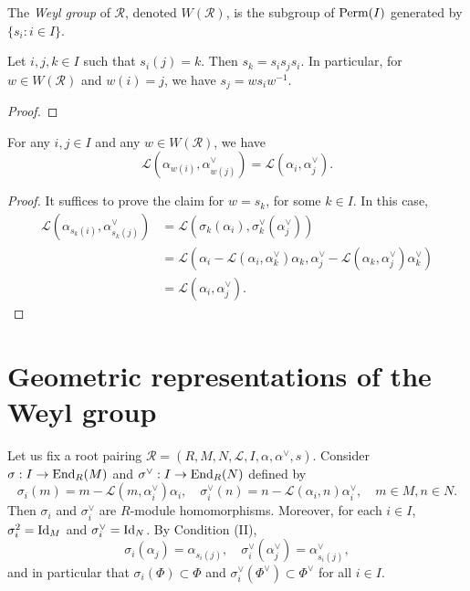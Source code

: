 \begin{definition}
    The {\it Weyl group} of $\mathcal{R}$, denoted $W(\mathcal{R})$, is the subgroup of ${\rm Perm}(I)$ 
    generated by $\{s_i : i \in I\}$. 
\end{definition}
\begin{lemma}
    Let $i,j,k \in I$ such that $s_i(j) = k$. Then $s_k = s_is_js_i$. In particular, for 
    $w \in W(\mathcal{R})$ and $w(i) = j$, we have $s_j = ws_iw^{-1}$. 
\end{lemma}
\begin{proof}

\end{proof}

\begin{lemma}
    For any $i,j \in I$ and any $w \in W(\mathcal{R})$, we have 
    \[
        \mathcal{L}(\alpha_{w(i)},\alpha^\vee_{w(j)}) = \mathcal{L}(\alpha_{i},\alpha_j^\vee).
    \]
\end{lemma}
\begin{proof}
    It suffices to prove the claim for $w = s_k$, for some $k \in I$. In this case, 
    \begin{align*}
        \mathcal{L}(\alpha_{s_k(i)},\alpha^\vee_{s_k(j)}) &=  \mathcal{L}(\sigma_k(\alpha_{i}),\sigma_k^\vee(\alpha^\vee_{j}))\\
                                &= \mathcal{L}(\alpha_{i} - \mathcal{L}(\alpha_i,\alpha_k^\vee)\alpha_k,\alpha^\vee_{j} - \mathcal{L}(\alpha_k,\alpha_j^\vee) \alpha_k^\vee)\\
                            & = \mathcal{L}(\alpha_{i},\alpha^\vee_{j}).
    \end{align*}
\end{proof}

\section{Geometric representations of the Weyl group}
Let us fix a root pairing $\mathcal{R} = (R,M,N,\mathcal{L},I,\alpha, \alpha^\vee,s)$. Consider $\sigma: I \to {\rm End}_R(M)$ and 
$\sigma^\vee : I \to {\rm End}_R(N)$ defined by
\[
    \sigma_i(m) = m - \mathcal{L}(m,\alpha^\vee_i)\alpha_i, \quad \sigma^\vee_i(n) = n - \mathcal{L}(\alpha_i,n)\alpha^\vee_i, \quad m \in M, n \in N.
\]
Then $\sigma_i$ and $\sigma^\vee_i$ are $R$-module homomorphisms. Moreover, 
for each $i \in I$, $\sigma_i^2 = {\rm Id}_M$ and $\sigma_i^\vee = {\rm Id}_N$. By Condition (II), 
\[
    \sigma_i(\alpha_j) = \alpha_{s_i(j)}, \quad \sigma^\vee_i(\alpha^\vee_j) = \alpha^\vee_{s_i(j)},
\]
and in particular that $\sigma_i(\Phi) \subset \Phi$ and 
$\sigma_i^\vee(\Phi^\vee) \subset \Phi^\vee$ for all $i \in I$.

